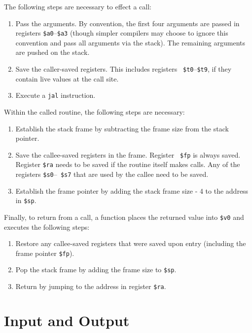 The following steps are necessary to effect a call:
\begin{enumerate}
  \item Pass the arguments.  By convention, the first four arguments
are passed in registers {\tt \$a0}--{\tt \$a3} (though simpler
compilers may choose to ignore this convention and pass all arguments
via the stack).  The remaining arguments are pushed on the stack.

  \item Save the caller-saved registers.  This includes registers {\tt
\$t0}--{\tt \$t9}, if they contain live values at the call site.

  \item Execute a {\tt jal} instruction.
\end{enumerate}

Within the called routine, the following steps are necessary:
\begin{enumerate}
  \item Establish the stack frame by subtracting the frame size from
the stack pointer.

  \item Save the callee-saved registers in the frame.  Register {\tt
\$fp} is always saved.  Register {\tt \$ra} needs to be saved if the
routine itself makes calls.  Any of the registers {\tt \$s0}--{\tt
\$s7} that are used by the callee need to be saved.

  \item Establish the frame pointer by adding the stack frame size - 4
to the address in {\tt \$sp}.
\end{enumerate}

Finally, to return from a call, a function places the returned value
into {\tt \$v0} and executes the following steps:
\begin{enumerate}
  \item Restore any callee-saved registers that were saved upon entry
(including the frame pointer {\tt \$fp}).

  \item Pop the stack frame by adding the frame size to {\tt \$sp}.

  \item Return by jumping to the address in register {\tt \$ra}.
\end{enumerate}

\section{Input and Output}
\label{sec:IO}

